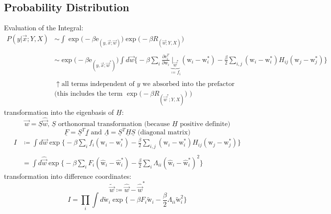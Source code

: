 \subsection{Probability Distribution}
Evaluation of the Integral:
\begin{equation} 
	\begin{array}{ll}
	P(y|\vec{x};Y,X) & 
		\sim \int \exp \big(-\beta \mathrm{e}_{(y,
			\vec{x};\vec{w})}\big)
			\exp \big(-\beta R_{(\vec{w};Y,X)}
			\big) \\\\
	&	\sim \exp \big(-\beta \mathrm{e}_{(y,
			\vec{x};\vec{w}^*)}\big)
			\int d \vec{w} \Big\{
				-\beta \sum_i \frac{\partial \mathrm{e}_i^T}{
					\partial \mathrm{w}_i} 
				\underbrace{\Big|_{\vec{w}^*}}_{
					\coloneqq f_i}
				(\mathrm{w}_i - \mathrm{w}_i^*) - 
				\frac{\beta}{2} \sum_{i,j} 
					(\mathrm{w}_i - \mathrm{w}_i^*)
				H_{ij} (\mathrm{w}_j - \mathrm{w}_j^*)
			\Big\}\\\\
	&	\uparrow \text{all terms independent of } y \text{ we
			absorbed into the prefactor} \\	
	&	\text{(this includes the term }
			\exp \big( -\beta 
				R_{(\vec{w}^*;Y,X)} \big)
			\text{ )}
	\end{array}
\end{equation}
transformation into the eigenbasis of $\underline{H}$:
\[ \vec{w} = \underline{S} \hat{\vec{w}}
	\text{, } \underline{S} \text{ orthonormal transformation (because }
	\underline{H} \text{ positive definite)}
\]
\[ \underline{F} = \underline{S}^T \underline{f} \text{ and }
	\underline{\Lambda} = \underline{S}^T \underline{H} \underline{S} 
	\text{ (diagonal matrix)}
\]
\begin{equation}
	\begin{array}{ll}
	I & \coloneqq \int d \vec{w} \exp \Big\{ -\beta 
		\sum_i f_i (\mathrm{w}_i - \mathrm{w}_i^*) 
		-\frac{\beta}{2} \sum_{i,j} (\mathrm{w}_i - \mathrm{w}_i^*)
		H_{ij} (\mathrm{w}_j - \mathrm{w}_j^*) \Big\} \\\\
	& = \int d \hat{\vec{w}} \exp \Big\{ -\beta 
		\sum_i F_i (\hat{\mathrm{w}}_i - \hat{\mathrm{w}}_i^*)
		-\frac{\beta}{2} \sum_i \Lambda_{ii} 
		(\hat{\mathrm{w}}_i - \hat{\mathrm{w}}_i^*)^2
		\Big\}
	\end{array}
\end{equation}
transformation into difference coordinates:
\[ \tilde{\vec{w}} \coloneqq \hat{\vec{w}}
	- \hat{\vec{w}}^*
\]
\begin{equation}
	I = \prod_i \int d \tilde{\mathrm{w}}_i \exp \Big\{
		-\beta F_i \tilde{\mathrm{w}}_i 
		-\frac{\beta}{2} \Lambda_{ii} \tilde{\mathrm{w}}_i^2
		\Big\}
\end{equation}
